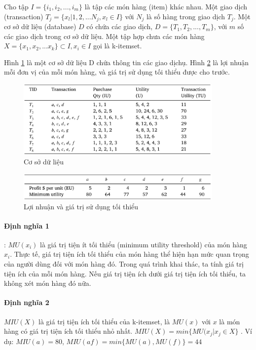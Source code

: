 
Cho tập $ I = \{i_1, i_2, ..., i_m\}$ là tập các món hàng (item) khác nhau. Một giao dịch (transaction) $T_j = \{x_l | 1, 2, ...N_j, x_l \in I \} $ với $N_j$ là số hàng trong giao dịch  $T_j$. Một cơ sở dữ liệu (database) $D$ có chứa các giao dịch, $D = \{T_1, T_2, ..., T_m\}$, với $m$ số các giao dịch trong cơ sở dữ liệu. Một tập hợp chưa các món hàng $X =\{ x_1, x_2, ... x_k \} \subset I, x_i \in I $ gọi là k-itemset. 

Hình \ref{fig:table2} là một cơ sở dữ liệu D chứa thông tin các giao dịchụ. Hình \ref{fig:table3} là lợi nhuận mỗi đơn vị của mỗi món hàng, và giá trị sử dụng tối thiểu được cho trước.



\begin{figure}[h]
\centering
\includegraphics[width=0.9\textwidth]{image/table/table2.PNG}
\caption{\label{fig:table2} Cơ sở dữ liệu}
\end{figure}

\begin{figure}[h]
\centering
\includegraphics[width=0.9\textwidth]{image/table/table3.PNG}
\caption{\label{fig:table3} Lợi nhuận và giá trị sử dụng tối thiểu}
\end{figure}

\paragraph{Định nghĩa 1}: $ MU(x_i) $ là giá trị tiện ít tối thiểu (minimum utility threshold) của món hàng $x_i$. Thực tế, giá trị tiện ích tối thiểu của món hàng thể hiện hạn mức quan trọng của người dùng đối với món hàng đó. Trong quá trình khai thác, ta tính giá trị tiện ích của mỗi món hàng. Nếu giá trị tiện ích dưới giá trị tiện ích tối thiểu, ta không xét món hàng đó nữa. 

\paragraph{Định nghĩa 2} $MIU(X)$ là giá trị tiện ích tối thiểu của k-itemset, là $MU(x)$ với $x$ là món hàng có giá trị tiện ích tối thiểu nhỏ nhất. $MIU(X) = min \{MU(x_j|x_j \in X\}$ . Ví dụ: $MIU(a) = 80$, $MIU(af) = min\{MU(a), MU(f)\} = 44$


